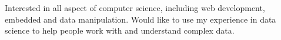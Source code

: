 

\begin{cvparagraph}


Interested in all aspect of computer science, including web development, embedded and data manipulation. Would like to use my experience in data science to help people work with and understand complex data. 

\end{cvparagraph}
\vspace{-0.2cm}